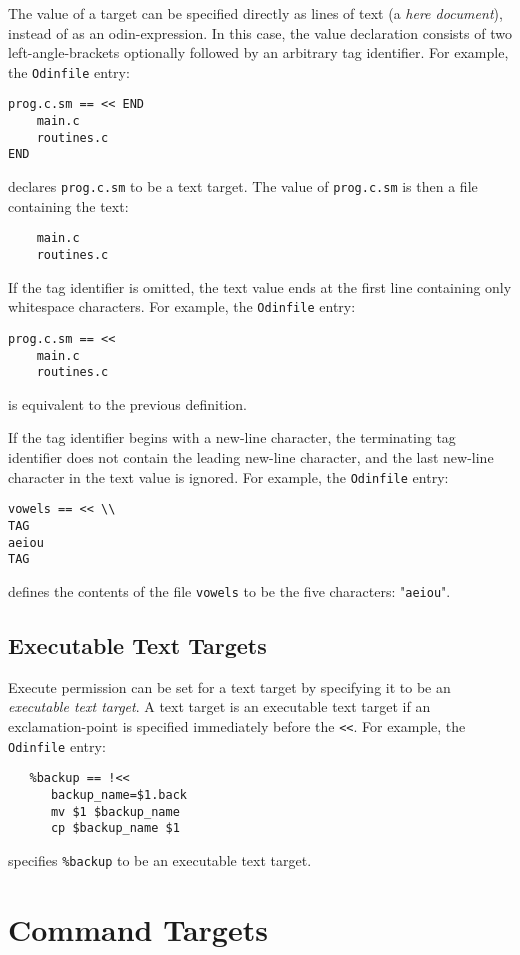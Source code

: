 \documentclass[hidelinks]{report}
\newcommand{\ex}{\tt}   %
\begin{document}
The value of a target can be specified directly as lines of text
(a {\em here document}), instead of as an odin-expression.
In this case, the value declaration consists of
two left-angle-brackets optionally followed by an arbitrary tag identifier.
For example, the {\ex Odinfile} entry:
\begin{verbatim}
prog.c.sm == << END
    main.c
    routines.c
END
\end{verbatim}
declares {\ex prog.c.sm} to be a text target.
The value of {\ex prog.c.sm} is then a file containing the text:
\begin{verbatim}
    main.c
    routines.c
\end{verbatim}

If the tag identifier is omitted, the text value ends at the first line
containing only whitespace characters.
For example, the {\ex Odinfile} entry:
\begin{verbatim}
prog.c.sm == <<
    main.c
    routines.c
\end{verbatim}
is equivalent to the previous definition.

If the tag identifier begins with a new-line character,
the terminating tag identifier does not contain the leading
new-line character,
and the last new-line character in the text value is ignored.
For example, the {\ex Odinfile} entry:
\begin{verbatim}
vowels == << \\
TAG
aeiou
TAG
\end{verbatim}
defines the contents of the file {\ex vowels} to be the
five characters: "{\ex aeiou}".

\subsection{Executable Text Targets}
\label{executabletarget}

Execute permission can be set for a text target by specifying
it to be an {\em executable text target}.
A text target is an executable text target
if an exclamation-point is specified immediately before the {\ex <<}.
For example, the {\ex Odinfile} entry:
\begin{verbatim}
   %backup == !<<
      backup_name=$1.back
      mv $1 $backup_name
      cp $backup_name $1
\end{verbatim}
specifies {\ex \%backup} to be an executable text target.


\section{Command Targets}
\label{commandtarget}
\end{document}
